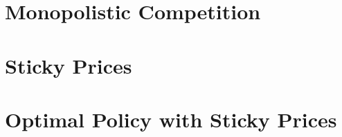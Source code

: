 \documentclass[11pt,a4paper,oneside]{book}
\begin{document}

\chapter{Monopolistic Competition}


\chapter{Sticky Prices}


\chapter{Optimal Policy with Sticky Prices}




\backmatter

\end{document}
